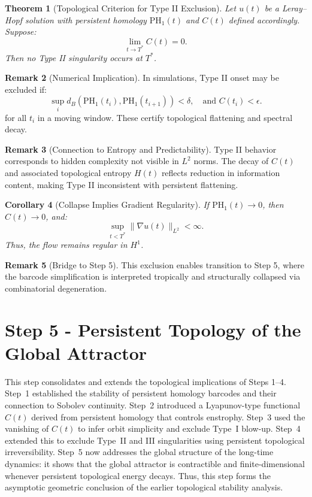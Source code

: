 \documentclass[11pt]{article}
\newtheorem{theorem}{Theorem}[section]
\newtheorem{corollary}[theorem]{Corollary}
\theoremstyle{definition}
\newtheorem{remark}[theorem]{Remark}
\begin{document}
\begin{theorem}[Topological Criterion for Type II Exclusion]
Let $u(t)$ be a Leray--Hopf solution with persistent homology $\mathrm{PH}_1(t)$ and $C(t)$ defined accordingly. Suppose:
\[
\lim_{t \to T^*} C(t) = 0.
\]
Then no Type II singularity occurs at $T^*$.
\end{theorem}

\begin{remark}[Numerical Implication]
In simulations, Type II onset may be excluded if:
\[
\sup_i d_B(\mathrm{PH}_1(t_i), \mathrm{PH}_1(t_{i+1})) < \delta, \quad \text{and } C(t_i) < \epsilon.
\]
for all $t_i$ in a moving window. These certify topological flattening and spectral decay.
\end{remark}

\begin{remark}[Connection to Entropy and Predictability]
Type II behavior corresponds to hidden complexity not visible in $L^2$ norms. The decay of $C(t)$ and associated topological entropy $H(t)$ reflects reduction in information content, making Type II inconsistent with persistent flattening.
\end{remark}

\begin{corollary}[Collapse Implies Gradient Regularity]
If $\mathrm{PH}_1(t) \to 0$, then $C(t) \to 0$, and:
\[
\sup_{t < T^*} \|\nabla u(t)\|_{L^2} < \infty.
\]
Thus, the flow remains regular in $H^1$.
\end{corollary}

\begin{remark}[Bridge to Step 5]
This exclusion enables transition to Step 5, where the barcode simplification is interpreted tropically and structurally collapsed via combinatorial degeneration.
\end{remark}

\section{Step 5 - Persistent Topology of the Global Attractor}
\label{sec:step5}

This step consolidates and extends the topological implications of Steps 1--4. Step~1 established the stability of persistent homology barcodes and their connection to Sobolev continuity. Step~2 introduced a Lyapunov-type functional $C(t)$ derived from persistent homology that controls enstrophy. Step~3 used the vanishing of $C(t)$ to infer orbit simplicity and exclude Type~I blow-up. Step~4 extended this to exclude Type~II and III singularities using persistent topological irreversibility. Step~5 now addresses the global structure of the long-time dynamics: it shows that the global attractor is contractible and finite-dimensional whenever persistent topological energy decays. Thus, this step forms the asymptotic geometric conclusion of the earlier topological stability analysis.
\end{document}
